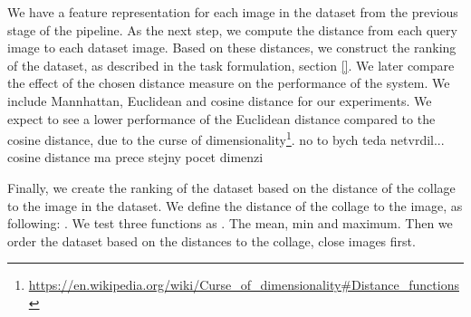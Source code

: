 
We have a feature representation for each image in the dataset from the previous stage of the pipeline. As the next step, we compute the distance from each query image to each dataset image. Based on these distances, we construct the ranking of the dataset, as described in the task formulation, section \ref{}\todo{}. We later compare the effect of the chosen distance measure on the performance of the system. We include Mannhattan, Euclidean and cosine distance for our experiments. We expect to see a lower performance of the Euclidean distance compared to the cosine distance, due to the curse of dimensionality\footnote{\url{https://en.wikipedia.org/wiki/Curse\_of\_dimensionality\#Distance\_functions}}. {\color{red} no to bych teda netvrdil... cosine distance ma prece stejny pocet dimenzi}

Finally, we create the ranking of the dataset based on the distance of the collage to the image in the dataset. We define the distance of the collage to the image, as following: \todo{}. We test three functions as $ $\todo{}. The mean, min and maximum. Then we order the dataset based on the distances to the collage, close images first.




